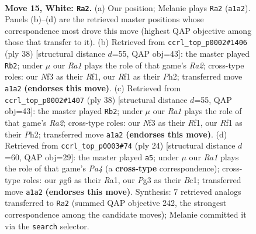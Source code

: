\documentclass[11pt]{article}
\begin{document}
\clearpage

\begin{figure}[p]\centering
\begin{subfigure}{0.46\textwidth}\centering
\resizebox{\linewidth}{!}{%
\newchessgame
\chessboard[
  setfen={r1b1kb1r/2p5/1pn3p1/p4p1p/3P4/1PPB1NP1/5P1P/R1B2RK1 w kq - 0 15},
  showmover=false,
  pgfstyle=straightmove, color=movearrow, markmove={a1-a2}
]}
\caption{}
\end{subfigure}\hfill
\begin{subfigure}{0.46\textwidth}\centering
\resizebox{\linewidth}{!}{%
\newchessgame
\chessboard[
  setfen={r1b1k2r/pp3ppp/2p1p3/1P4B1/1b1P4/4PN2/R1B1nPPP/5R1K w kq - 3 20},
  showmover=false,
  pgfstyle=straightmove, color=movearrow, markmove={a2-b2}
]}
\caption{}
\end{subfigure}
\\[4pt]
\begin{subfigure}{0.46\textwidth}\centering
\resizebox{\linewidth}{!}{%
\newchessgame
\chessboard[
  setfen={r1b1k2r/pp3ppp/2p1p3/1P4B1/1b1P4/4PN2/R1B1nPPP/5R1K w kq - 3 20},
  showmover=false,
  pgfstyle=straightmove, color=movearrow, markmove={a2-b2}
]}
\caption{}
\end{subfigure}\hfill
\begin{subfigure}{0.46\textwidth}\centering
\resizebox{\linewidth}{!}{%
\newchessgame
\chessboard[
  setfen={r1b1kb1r/1pp2ppp/p1p3n1/4P3/P7/2N2N1P/1PP2PP1/R1BR2K1 w - - 1 13},
  showmover=false,
  pgfstyle=straightmove, color=movearrow, markmove={a4-a5}
]}
\caption{}
\end{subfigure}
\caption{\textbf{Move 15, White: \texttt{Ra2}.} (a) Our position; Melanie plays \texttt{Ra2} (\texttt{a1a2}). Panels (b)--(d) are the retrieved master positions whose correspondence most drove this move (highest QAP objective among those that transfer to it). (b) Retrieved from \texttt{ccrl\_top\_p0002\#1406} (ply 38) [structural distance $d$=55, QAP obj=43]: the master played \texttt{Rb2}; under $\mu$ our \emph{Ra1} plays the role of that game's \emph{Ra2}; cross-type roles: our \emph{N}f3 as their \emph{R}f1, our \emph{R}f1 as their \emph{P}h2; transferred move \texttt{a1a2} \textbf{(endorses this move)}. (c) Retrieved from \texttt{ccrl\_top\_p0002\#1407} (ply 38) [structural distance $d$=55, QAP obj=43]: the master played \texttt{Rb2}; under $\mu$ our \emph{Ra1} plays the role of that game's \emph{Ra2}; cross-type roles: our \emph{N}f3 as their \emph{R}f1, our \emph{R}f1 as their \emph{P}h2; transferred move \texttt{a1a2} \textbf{(endorses this move)}. (d) Retrieved from \texttt{ccrl\_top\_p0003\#74} (ply 24) [structural distance $d$=60, QAP obj=29]: the master played \texttt{a5}; under $\mu$ our \emph{Ra1} plays the role of that game's \emph{Pa4} (a \textbf{cross-type} correspondence); cross-type roles: our \emph{p}g6 as their \emph{R}a1, our \emph{P}g3 as their \emph{B}c1; transferred move \texttt{a1a2} \textbf{(endorses this move)}. Synthesis: 7 retrieved analogs transferred to \texttt{Ra2} (summed QAP objective 242, the strongest correspondence among the candidate moves); Melanie committed it via the \texttt{search} selector.}
\label{fig:thought-m28}
\end{figure}
\end{document}
